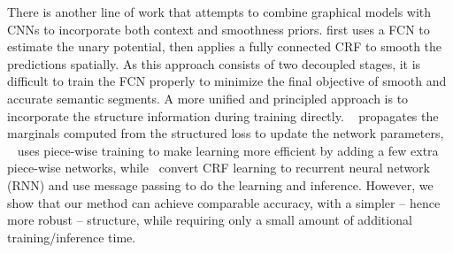 \documentclass{article} %
\begin{document}
There is another line of work that attempts to combine graphical models with CNNs to incorporate both context and smoothness priors. \cite{chen2014semantic} first uses a FCN to estimate the unary potential, then applies a fully connected CRF to smooth the predictions spatially. As this approach consists of two decoupled stages, it is difficult to train the FCN properly to minimize the final objective of smooth and accurate semantic segments. A more unified and principled approach is to incorporate the structure information during training directly. ~\cite{schwing2015fully} propagates the marginals computed from the structured loss to update the network parameters, ~\cite{lin2015efficient} uses piece-wise training to make learning more efficient by adding a few extra piece-wise networks, while~\cite{zheng2015conditional} convert CRF learning to recurrent neural network (RNN) and use message passing to do the learning and inference. However, we show that our method can achieve comparable accuracy, with a simpler -- hence more robust -- structure, while requiring only a small amount of additional training/inference time.
\end{document}

